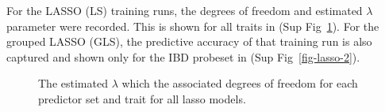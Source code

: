 For the LASSO (LS) training runs, the degrees of freedom and estimated
\(\lambda\) parameter were recorded. This is shown for all traits in
(Sup Fig~\ref{fig-lasso}). For the grouped LASSO (GLS), the predictive
accuracy of that training run is also captured and shown only for the
IBD probeset in (Sup Fig~\ref{fig-lasso-2}).

\begin{figure}[h!]


\caption{\label{fig-lasso}The estimated \(\lambda\) which the associated
degrees of freedom for each predictor set and trait for all lasso
models.}

\end{figure}%

